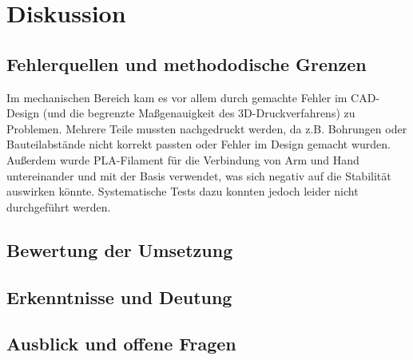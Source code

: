 \section{Diskussion}


\subsection{Fehlerquellen und methododische Grenzen}

Im mechanischen Bereich kam es vor allem durch gemachte Fehler im CAD-Design (und die begrenzte Maßgenauigkeit des 3D-Druckverfahrens) zu Problemen. Mehrere Teile mussten nachgedruckt werden, da z.B. Bohrungen oder Bauteilabstände nicht korrekt passten oder Fehler im Design gemacht wurden. 
Außerdem wurde PLA-Filament für die Verbindung von Arm und Hand untereinander und mit der Basis verwendet, was sich negativ auf die Stabilität auswirken könnte. Systematische Tests dazu konnten jedoch leider nicht durchgeführt werden.

\subsection{Bewertung der Umsetzung}

\subsection{Erkenntnisse und Deutung}

\subsection{Ausblick und offene Fragen}


